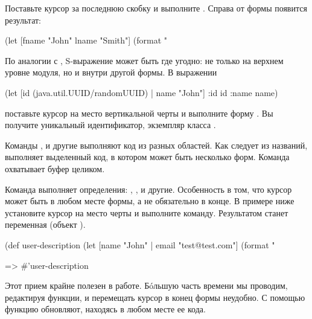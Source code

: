 Поставьте курсор за последнюю скобку и выполните . Справа от формы появится результат:

\begin{english}
  \begin{clojure}
(let [fname "John"
      lname "Smith"]
  (format "%
  \end{clojure}
\end{english}

По аналогии с , S-выражение может быть где угодно: не только на верхнем уровне модуля, но и внутри другой формы. В выражении

\begin{english}
  \begin{clojure}
(let [id (java.util.UUID/randomUUID) |
      name "John"]
  {:id id
   :name name})
  \end{clojure}
\end{english}

\noindent
поставьте курсор на место вертикальной черты и выполните форму . Вы получите уникальный идентификатор, экземпляр класса .

Команды ,  и другие выполняют код из разных областей. Как следует из названий,  выполняет выделенный код, в котором может быть несколько форм. Команда  охватывает буфер целиком.

Команда  выполняет определения: , ,  и другие. Особенность в том, что курсор может быть в любом месте формы, а не обязательно в конце. В примере ниже установите курсор на место черты и выполните команду. Результатом станет переменная  (объект ).

\begin{english}
  \begin{clojure}
(def user-description
  (let [name "John" |
        email "test@test.com"]
    (format "%

=> #'user-description
  \end{clojure}
\end{english}

Этот прием крайне полезен в работе. Бóльшую часть времени мы проводим, редактируя функции, и перемещать курсор в конец формы неудобно. С помощью  функцию обновляют, находясь в любом месте ее кода.

